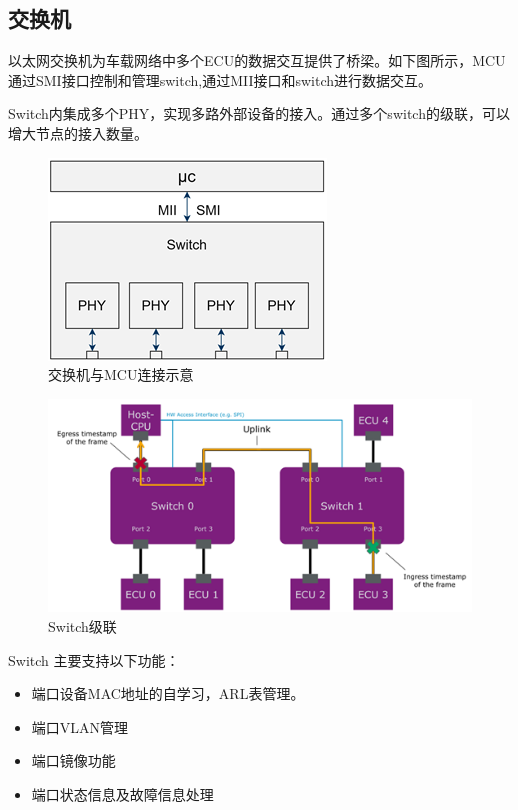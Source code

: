 \subsection{交换机}
以太网交换机为车载网络中多个ECU的数据交互提供了桥梁。如下图所示，MCU通过SMI接口控制和管理switch,通过MII接口和switch进行数据交互。

Switch内集成多个PHY，实现多路外部设备的接入。通过多个switch的级联，可以增大节点的接入数量。

\begin{figure}[ht]
    \centering
    \includegraphics[scale=1]{pic/connect_bt_mcu_switch.png}
    \caption{交换机与MCU连接示意}
    \label{fig:connect_bt_mcu_switch}
\end{figure}

\begin{figure}[ht]
    \centering
    \includegraphics[scale=1]{pic/switch_cap.png}
    \caption{Switch级联}
    \label{fig:switch_cap}
\end{figure}

Switch 主要支持以下功能：
\begin{itemize}
    \item 端口设备MAC地址的自学习，ARL表管理。
    \item 端口VLAN管理
    \item 端口镜像功能
    \item 端口状态信息及故障信息处理 
\end{itemize}

